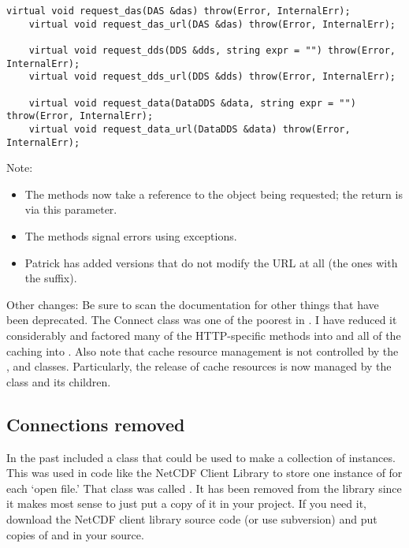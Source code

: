 \documentclass[justify]{dods-paper}
\begin{document}
\begin{lstlisting}[caption={Methods from Connect}]
    virtual void request_das(DAS &das) throw(Error, InternalErr);
    virtual void request_das_url(DAS &das) throw(Error, InternalErr);

    virtual void request_dds(DDS &dds, string expr = "") throw(Error, InternalErr);
    virtual void request_dds_url(DDS &dds) throw(Error, InternalErr);

    virtual void request_data(DataDDS &data, string expr = "") throw(Error, InternalErr);
    virtual void request_data_url(DataDDS &data) throw(Error, InternalErr);
\end{lstlisting}

Note:
\begin{itemize}
\item The methods now take a reference to the object being requested;
  the return is via this parameter.
\item The methods signal errors using exceptions.
\item Patrick has added versions that do not modify the URL at all (the
  ones with the  suffix).
\end{itemize}

Other changes: Be sure to scan the  documentation for
other things that have been deprecated. The Connect class was one of
the poorest in . I have reduced it considerably and
factored many of the HTTP-specific methods into  and
all of the caching into . Also note that cache resource
management is not controlled by the , 
and  classes. Particularly, the release of
cache resources is now managed by the  class and its children.

\subsection{Connections removed}

In the past  included a class that could be used to make a
collection of  instances. This was used in code like the
NetCDF Client Library to store one instance of  for each
`open file.' That class was called . It has been
removed from the library since it makes most sense to just put a copy
of it in your project. If you need it, download the NetCDF client
library source code (or use subversion) and put copies of
 and  in your source.
\end{document}
